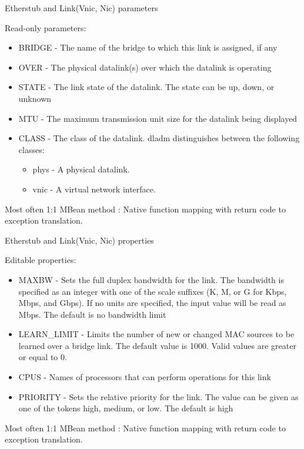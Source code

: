 \documentclass{beamer}
\begin{document}
		\begin{frame}{Etherstub and Link(Vnic, Nic) parameters }

			Read-only parameters:
			
			\begin{itemize}

				\item BRIDGE - The name of the bridge to which this link is assigned, if any
				\item OVER - The physical datalink(s) over which the datalink is operating
				\item STATE - The link state of the datalink. The state can be up, down, or unknown
				\item MTU - The maximum transmission unit size for the datalink being displayed
				\item CLASS - The class of the datalink. dladm distinguishes between the following classes:

					\begin{itemize}
						\item phys - A physical datalink. 
						\item vnic - A virtual network interface. 				
					\end{itemize}			
			\end{itemize}

			Most often 1:1 MBean method : Native function mapping with return code to exception translation.

		\end{frame}

		\begin{frame}{Etherstub and Link(Vnic, Nic) properties }

			Editable properties:
			
			\begin{itemize}

				\item MAXBW - Sets the full duplex bandwidth for the link. The bandwidth is specified as an integer with one of the scale suffixes (K, M, or G for Kbps, Mbps, and Gbps). If no units are specified, the input value will be read as Mbps. The default is no bandwidth limit
				\item LEARN_LIMIT - Limits the number of new or changed MAC sources to be learned over a bridge link. The default value is 1000. Valid values are greater or equal to 0.
				\item CPUS - Names of processors that can perform operations for this link
				\item PRIORITY - Sets the relative priority for the link. The value can be given as one of the tokens high, medium, or low. The default is high
				
			
			\end{itemize}

			Most often 1:1 MBean method : Native function mapping with return code to exception translation.

		\end{frame}
\end{document}
